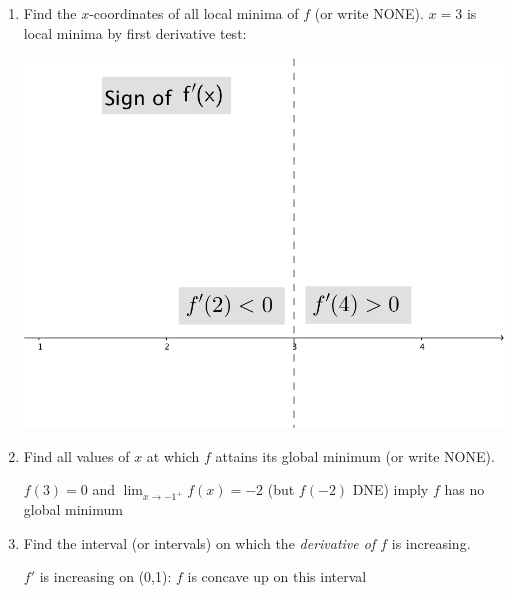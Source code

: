 \documentclass[nooutcomes]{ximera}
\begin{document}
\begin{problem}
\begin{enumerate}
\begin{enumerate}
        \item
          Find the $x$-coordinates of all local minima of $f$ (or write NONE).
          $x = 3$ is local minima by first derivative test:  
          \begin{freeResponse} \hfil
            \begin{image}
              \includegraphics[scale = 0.7]{figure1.png}
            \end{image}
          \end{freeResponse}

        \item
          Find all values of $x$ at which $f$ attains its global minimum (or write NONE).
          \begin{freeResponse}
            $f(3) = 0$ and $\lim_{x \to -1^+} f(x) = -2$ (but $f(-2)$ DNE) imply $f$ has no global minimum
          \end{freeResponse}

        \item
          Find the interval (or intervals) on which the \emph{derivative of $f$} is increasing.
          \begin{freeResponse}
            $f'$ is increasing  on (0,1): $f$ is concave up on this interval
          \end{freeResponse}

      \end{enumerate}


\end{enumerate}
\end{problem}
\end{document}

